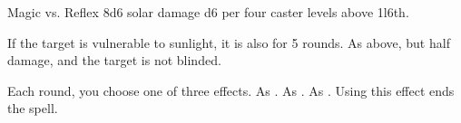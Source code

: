 \begin{spellheader}
    \begin{spelltargetinginfo}
    \end{spelltargetinginfo}
    \begin{spelleffects}
    \end{spelleffects}
\end{spellheader}
\begin{spellcontent}
    \begin{spellattack}{Magic vs. Reflex}
        \spellsuccess 8d6 solar damage \add d6 per four caster levels above 1l6th.

        If the target is vulnerable to sunlight, it is also \blinded for 5 rounds.
        \spellfailure As above, but half damage, and the target is not blinded.
    \end{spellattack}
\end{spellcontent}
\begin{spellfooter}

\end{spellfooter}

\begin{comment}
\subsubsection{T}
\end{comment}

\begin{spellheader}
    \spellrng{\rngmed}
\end{spellheader}
\begin{spellcontent}
    \spellspecial Each round, you choose one of three effects.
     As .
     As .
     As . Using this effect ends the spell.
\end{spellcontent}
\begin{spellfooter}

\end{spellfooter}

